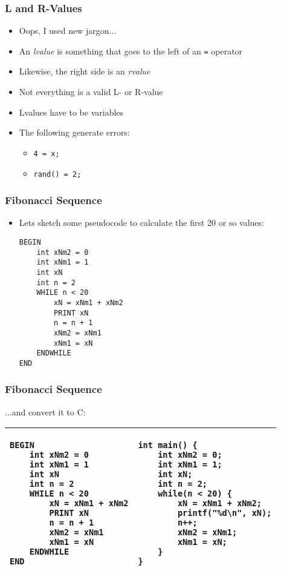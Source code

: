 \documentclass[14pt]{beamer}
\begin{document}
\begin{frame}
\frametitle{L and R-Values}
\begin{itemize}
\item Oops, I used new jargon...
\item An \textit{lvalue} is something that goes to the left of an \texttt{=} operator
\item Likewise, the right side is an \textit{rvalue}
\item Not everything is a valid L- or R-value
\item Lvalues have to be variables
\item The following generate errors:
	\begin{itemize}
		\item \texttt{4 = x;}
		\item \texttt{rand() = 2;}
	\end{itemize}
\end{itemize}
\end{frame}

\begin{frame}[fragile]
\frametitle{Fibonacci Sequence}
\begin{itemize}
	\item Lets sketch some pseudocode to calculate the first 20 or so values:
	\begin{lstlisting}[style=pseudo]
BEGIN
	int xNm2 = 0
	int xNm1 = 1
	int xN
	int n = 2
	WHILE n < 20
		xN = xNm1 + xNm2
		PRINT xN
		n = n + 1
		xNm2 = xNm1
		xNm1 = xN
	ENDWHILE
END
	\end{lstlisting}
\end{itemize}
\end{frame}

\begin{frame}[fragile]
\frametitle{Fibonacci Sequence}
...and convert it to C:
\begin{table}[H]
\centering

\begin{tabular}{ll}
\hline

\begin{lstlisting}[style=pseudo,basicstyle=\ttfamily\footnotesize]
BEGIN
	int xNm2 = 0
	int xNm1 = 1
	int xN
	int n = 2
	WHILE n < 20
		xN = xNm1 + xNm2
		PRINT xN
		n = n + 1
		xNm2 = xNm1
		xNm1 = xN
	ENDWHILE
END
\end{lstlisting} &

\begin{lstlisting}[style=Ctable,basicstyle=\ttfamily\footnotesize]
int main() {
	int xNm2 = 0;
	int xNm1 = 1;
	int xN;
	int n = 2;
	while(n < 20) {
		xN = xNm1 + xNm2;
		printf("%d\n", xN);
		n++;
		xNm2 = xNm1;
		xNm1 = xN;
	}
}
\end{lstlisting}
\\

\hline
\end{tabular}
\end{table}
\end{frame}
\end{document}
